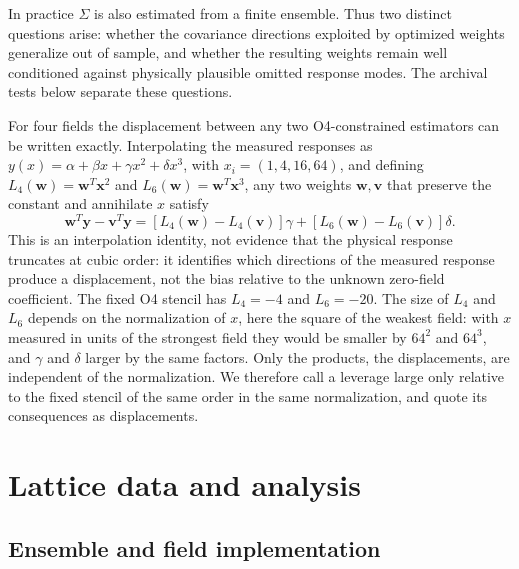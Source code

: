 \documentclass[aps,prd,reprint,twocolumn,superscriptaddress,nofootinbib,longbibliography]{revtex4-2}
\begin{document}
In practice $\Sigma$ is also estimated from a finite ensemble. Thus two distinct questions arise: whether the covariance directions exploited by optimized weights generalize out of sample, and whether the resulting weights remain well conditioned against physically plausible omitted response modes. The archival tests below separate these questions.

For four fields the displacement between any two O4-constrained estimators can be written exactly. Interpolating the measured responses as $y(x)=\alpha+\beta x+\gamma x^2+\delta x^3$, with $x_i=(1,4,16,64)$, and defining $L_4(\bm w)=\bm w^T\bm x^2$ and $L_6(\bm w)=\bm w^T\bm x^3$, any two weights $\bm w,\bm v$ that preserve the constant and annihilate $x$ satisfy
\begin{equation}
\bm w^T\bm y-\bm v^T\bm y=[L_4(\bm w)-L_4(\bm v)]\gamma+[L_6(\bm w)-L_6(\bm v)]\delta .
\label{eq:leverageidentity}
\end{equation}
This is an interpolation identity, not evidence that the physical response truncates at cubic order: it identifies which directions of the measured response produce a displacement, not the bias relative to the unknown zero-field coefficient. The fixed O4 stencil has $L_4=-4$ and $L_6=-20$. The size of $L_4$ and $L_6$ depends on the normalization of $x$, here the square of the weakest field: with $x$ measured in units of the strongest field they would be smaller by $64^2$ and $64^3$, and $\gamma$ and $\delta$ larger by the same factors. Only the products, the displacements, are independent of the normalization. We therefore call a leverage large only relative to the fixed stencil of the same order in the same normalization, and quote its consequences as displacements.


\section{Lattice data and analysis}
\label{sec:methods}
\subsection{Ensemble and field implementation}
\end{document}
